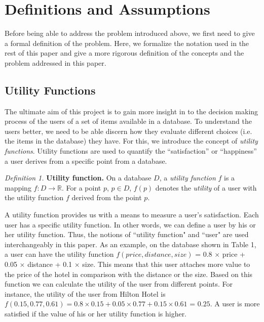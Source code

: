\section{Definitions and Assumptions}
Before being able to address the problem introduced above, we first need to give a formal definition of the problem. Here, we formalize the notation used in the rest of this paper and give a more rigorous definition of the concepts and the problem addressed in this paper.

\subsection{Utility Functions}
The ultimate aim of this project is to gain more insight in to the decision making process of the users of a set of items available in a database. To understand the users better, we need to be able discern how they evaluate different choices (i.e. the items in the database) they have. For this, we introduce the concept of \textit{utility functions}. Utility functions are used to quantify the ``satisfaction'' or ``happiness'' a user derives from a specific point from a database.

\medskip
\indent \textit{Definition 1.}  \textbf{Utility function.} On a database $D$, a \textit{utility function} $f$ is a mapping $f: D \rightarrow \mathbb{R}$. For a point $p$, $p \in D$, $f(p)$ denotes the \textit{utility} of a user with the utility function $f$ derived from the point $p$.
\medskip


A utility function provides us with a means to measure a user's satisfaction. Each user has a specific utility function. In other words, we can define a user by his or her utility function. Thus, the notions of ``utility function" and ``user" are used interchangeably in this paper. As an example, on the database shown in Table 1, a user can have the utility function $f(price, distance, size)$ = 0.8 $\times$ price + 0.05 $\times$ distance + 0.1 $\times$ size. This means that this user attaches more value to the price of the hotel in comparison with the distance or the size. Based on this function we can calculate the utility of the user from different points. For instance, the utility of the user from Hilton Hotel is $f(0.15, 0.77, 0.61) = 0.8 \times 0.15 + 0.05 \times 0.77 + 0.15 \times 0.61$ = $0.25$. A user is more satisfied if the value of his or her utility function is higher. 

